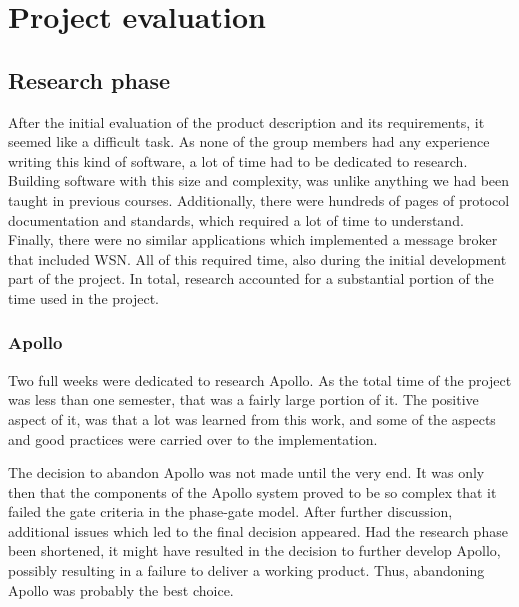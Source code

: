 
\chapter{Project evaluation}
\label{ch:project_evaluation}

\section{Research phase}
\label{sec:project_evaluation-research_phase}


After the initial evaluation of the product description and its requirements, it seemed like a difficult task. As none of the group members had any experience writing this kind of software, a lot of time had to be dedicated to research. Building software with this size and complexity, was unlike anything we had been taught in previous courses. Additionally, there were hundreds of pages of protocol documentation and standards, which required a lot of time to understand. Finally, there were no similar applications which implemented a message broker that included WSN. All of this required time, also during the initial development part of the project. In total, research accounted for a substantial portion of the time used in the project.

\subsection{Apollo}
\label{subsec:project_evaluation-research_phase-apollo}

Two full weeks were dedicated to research Apollo. As the total time of the project was less than one semester, that was a fairly large portion of it. The positive aspect of it, was that a lot was learned from this work, and some of the aspects and good practices were carried over to the implementation.

The decision to abandon Apollo was not made until the very end. It was only then that the components of the Apollo system proved to be so complex that it failed the gate criteria in the phase-gate model. After further discussion, additional issues which led to the final decision appeared. Had the research phase been shortened, it might have resulted in the decision to further develop Apollo, possibly resulting in a failure to deliver a working product. Thus, abandoning Apollo was probably the best choice.

